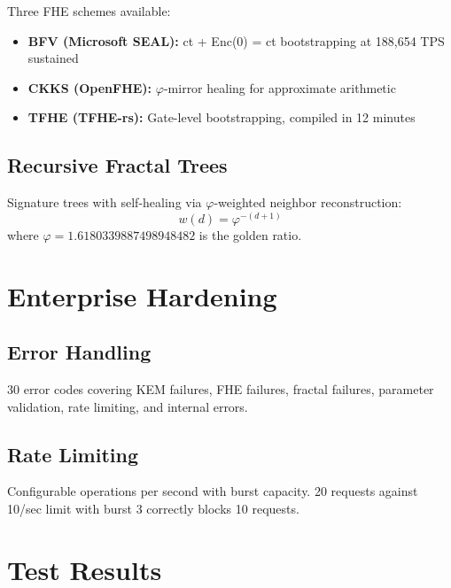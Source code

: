 \documentclass{article}
\begin{document}
Three FHE schemes available:
\begin{itemize}
\item \textbf{BFV (Microsoft SEAL):} ct + Enc(0) = ct bootstrapping at 188,654 TPS sustained
\item \textbf{CKKS (OpenFHE):} $\varphi$-mirror healing for approximate arithmetic
\item \textbf{TFHE (TFHE-rs):} Gate-level bootstrapping, compiled in 12 minutes
\end{itemize}

\subsection{Recursive Fractal Trees}

Signature trees with self-healing via $\varphi$-weighted neighbor reconstruction:
\begin{equation}
w(d) = \varphi^{-(d+1)}
\end{equation}
where $\varphi = 1.6180339887498948482$ is the golden ratio.

\section{Enterprise Hardening}

\subsection{Error Handling}
30 error codes covering KEM failures, FHE failures, fractal failures, parameter validation, rate limiting, and internal errors.

\subsection{Rate Limiting}
Configurable operations per second with burst capacity. 20 requests against 10/sec limit with burst 3 correctly blocks 10 requests.

\section{Test Results}
\end{document}
